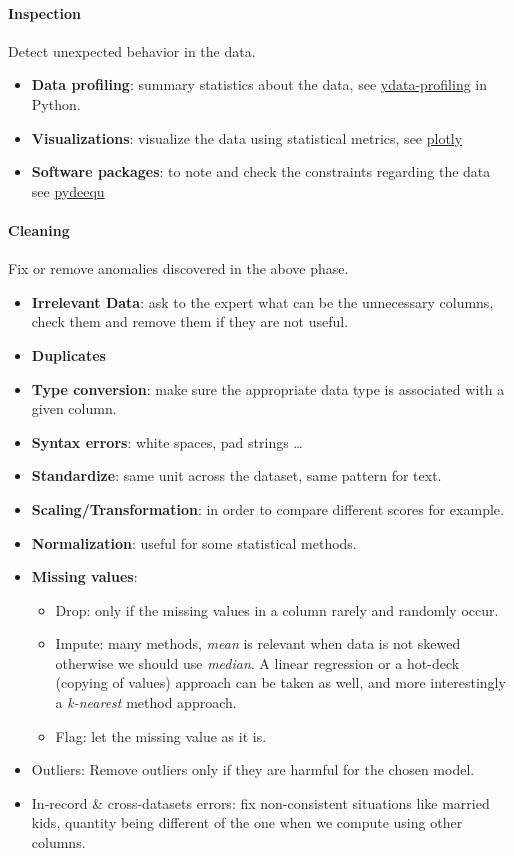 \paragraph{Inspection} 
Detect unexpected behavior in the data.
\begin{itemize}
    \item \textbf{Data profiling}: summary statistics about the data, see \href{https://github.com/ydataai/ydata-profiling}{ydata-profiling} in Python.
    \item \textbf{Visualizations}: visualize the data using statistical metrics, see
        \href{https://plotly.com/python/}{plotly}
    \item \textbf{Software packages}: to note and check the constraints regarding the data
        see \href{https://pypi.org/project/pydeequ/}{pydeequ}
\end{itemize}

\paragraph{Cleaning} 
Fix or remove anomalies discovered in the above phase.
\begin{itemize}
    \item \textbf{Irrelevant Data}: ask to the expert what can be the unnecessary columns,
        check them and remove them if they are not useful.
    \item \textbf{Duplicates}
    \item \textbf{Type conversion}: make sure the appropriate data type is associated with
        a given column.
    \item \textbf{Syntax errors}: white spaces, pad strings \dots
    \item \textbf{Standardize}: same unit across the dataset, same pattern for text.
    \item \textbf{Scaling/Transformation}: in order to compare different scores for 
        example.
    \item \textbf{Normalization}: useful for some statistical methods.
    \item \textbf{Missing values}: 
        \begin{itemize}
            \item Drop: only if the missing values in a column rarely and randomly occur.
            \item Impute: many methods, \textit{mean} is relevant when data is not skewed 
                otherwise we should use \textit{median}. A linear regression or a hot-deck
                (copying of values) approach can be taken as well, and more interestingly 
                a \textit{k-nearest} method approach.
            \item Flag: let the missing value as it is.
        \end{itemize}
    \item Outliers: Remove outliers only if they are harmful for the chosen model.
    \item In-record \& cross-datasets errors: fix non-consistent situations like married 
        kids, quantity being different of the one when we compute using other columns.
\end{itemize}

